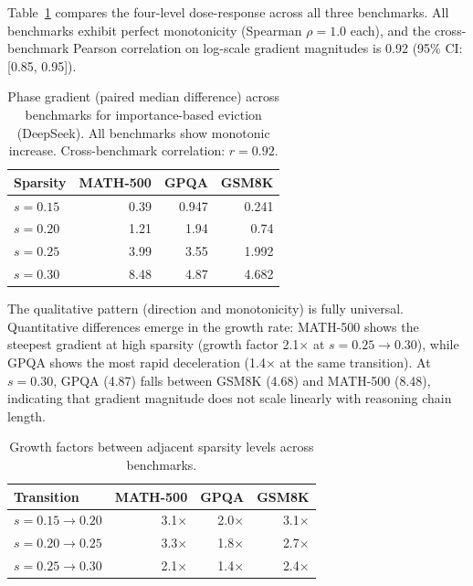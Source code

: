 \documentclass[11pt,a4paper]{article}
\begin{document}
Table~\ref{tab:cross-benchmark} compares the four-level dose-response across all three benchmarks. All benchmarks exhibit perfect monotonicity (Spearman $\rho{=}1.0$ each), and the cross-benchmark Pearson correlation on log-scale gradient magnitudes is 0.92 (95\% CI: [0.85, 0.95]).

\begin{table}[t]
\centering
\caption{Phase gradient (paired median difference) across benchmarks for importance-based eviction (DeepSeek). All benchmarks show monotonic increase. Cross-benchmark correlation: $r{=}0.92$.}
\label{tab:cross-benchmark}
\small
\begin{tabular}{lrrr}
\toprule
Sparsity & MATH-500 & GPQA & GSM8K \\
\midrule
$s{=}0.15$ & 0.39 & 0.947 & 0.241 \\
$s{=}0.20$ & 1.21 & 1.94 & 0.74 \\
$s{=}0.25$ & 3.99 & 3.55 & 1.992 \\
$s{=}0.30$ & 8.48 & 4.87 & 4.682 \\
\bottomrule
\end{tabular}
\end{table}

The qualitative pattern (direction and monotonicity) is fully universal. Quantitative differences emerge in the growth rate: MATH-500 shows the steepest gradient at high sparsity (growth factor 2.1$\times$ at $s{=}0.25 \to 0.30$), while GPQA shows the most rapid deceleration (1.4$\times$ at the same transition). At $s{=}0.30$, GPQA (4.87) falls between GSM8K (4.68) and MATH-500 (8.48), indicating that gradient magnitude does not scale linearly with reasoning chain length.

\begin{table}[t]
\centering
\caption{Growth factors between adjacent sparsity levels across benchmarks.}
\label{tab:growth-factors}
\small
\begin{tabular}{lrrr}
\toprule
Transition & MATH-500 & GPQA & GSM8K \\
\midrule
$s{=}0.15 \to 0.20$ & 3.1$\times$ & 2.0$\times$ & 3.1$\times$ \\
$s{=}0.20 \to 0.25$ & 3.3$\times$ & 1.8$\times$ & 2.7$\times$ \\
$s{=}0.25 \to 0.30$ & 2.1$\times$ & 1.4$\times$ & 2.4$\times$ \\
\bottomrule
\end{tabular}
\end{table}

\end{document}

